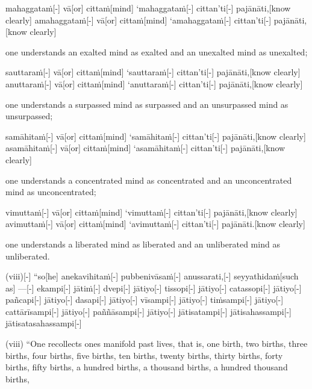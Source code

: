\begin{samepage}
\begingl[glneveryline={\PaliGlossA,\PaliGlossB}]
mahaggataṁ[-] vā[or] cittaṁ[mind] ‘mahaggataṁ[-] cittan’ti[-] pajānāti,[know clearly] amahaggataṁ[-] vā[or] cittaṁ[mind] ‘amahaggataṁ[-] cittan’ti[-] pajānāti,[know clearly]
\endgl
\nopagebreak
\linespread{0.5}
\begin{spacin}{0.2}
{\PaliGlossFT one understands an exalted mind as exalted and an unexalted mind as unexalted;}
\end{spacin}
\vskip 12pt
\end{samepage}
\begin{samepage}
\begingl[glneveryline={\PaliGlossA,\PaliGlossB}]
sauttaraṁ[-] vā[or] cittaṁ[mind] ‘sauttaraṁ[-] cittan’ti[-] pajānāti,[know clearly] anuttaraṁ[-] vā[or] cittaṁ[mind] ‘anuttaraṁ[-] cittan’ti[-] pajānāti,[know clearly]
\endgl
\nopagebreak
\linespread{0.5}
\begin{spacin}{0.2}
{\PaliGlossFT one understands a surpassed mind as surpassed and an unsurpassed mind as unsurpassed;}
\end{spacin}
\vskip 12pt
\end{samepage}
\begin{samepage}
\begingl[glneveryline={\PaliGlossA,\PaliGlossB}]
samāhitaṁ[-] vā[or] cittaṁ[mind] ‘samāhitaṁ[-] cittan’ti[-] pajānāti,[know clearly] asamāhitaṁ[-] vā[or] cittaṁ[mind] ‘asamāhitaṁ[-] cittan’ti[-] pajānāti,[know clearly]
\endgl
\nopagebreak
\linespread{0.5}
\begin{spacin}{0.2}
{\PaliGlossFT one understands a concentrated mind as concentrated and an unconcentrated mind as unconcentrated;}
\end{spacin}
\vskip 12pt
\end{samepage}
\begin{samepage}
\begingl[glneveryline={\PaliGlossA,\PaliGlossB}]
vimuttaṁ[-] vā[or] cittaṁ[mind] ‘vimuttaṁ[-] cittan’ti[-] pajānāti,[know clearly] avimuttaṁ[-] vā[or] cittaṁ[mind] ‘avimuttaṁ[-] cittan’ti[-] pajānāti.[know clearly]
\endgl
\nopagebreak
\linespread{0.5}
\begin{spacin}{0.2}
{\PaliGlossFT one understands a liberated mind as liberated and an unliberated mind as unliberated.}
\end{spacin}
\vskip 12pt
\end{samepage}
\begin{samepage}
\begingl[glneveryline={\PaliGlossA,\PaliGlossB}]
(viii)[-] “so[he] anekavihitaṁ[-] pubbenivāsaṁ[-] anussarati,[-] seyyathidaṁ[such as] —[-] ekampi[-] jātiṁ[-] dvepi[-] jātiyo[-] tissopi[-] jātiyo[-] catassopi[-] jātiyo[-] pañcapi[-] jātiyo[-] dasapi[-] jātiyo[-] vīsampi[-] jātiyo[-] tiṁsampi[-] jātiyo[-] cattārīsampi[-] jātiyo[-] paññāsampi[-] jātiyo[-] jātisatampi[-] jātisahassampi[-] jātisatasahassampi[-]
\endgl
\nopagebreak
\linespread{0.5}
\begin{spacin}{0.2}
{\PaliGlossFT (viii) “One recollects ones manifold past lives, that is, one birth, two births, three births, four births, five births, ten births, twenty births, thirty births, forty births, fifty births, a hundred births, a thousand births, a hundred thousand births,}
\end{spacin}
\vskip 12pt
\end{samepage}
